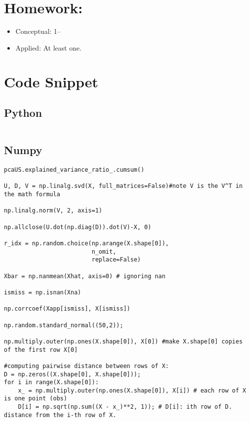 \documentclass[
  letterpaper,
  DIV=11,
  numbers=noendperiod]{scrreprt}
\providecommand{\tightlist}{%
  \setlength{\itemsep}{0pt}\setlength{\parskip}{0pt}}\usepackage{longtable,booktabs,array}
\begin{document}
\section{Homework:}\label{homework-8}

\begin{itemize}
\tightlist
\item
  Conceptual: 1--
\item
  Applied: At least one.
\end{itemize}

\section{Code Snippet}\label{code-snippet-6}

\subsection{Python}\label{python-10}

\begin{verbatim}

\end{verbatim}

\subsection{Numpy}\label{numpy-10}

\begin{verbatim}
pcaUS.explained_variance_ratio_.cumsum()

U, D, V = np.linalg.svd(X, full_matrices=False)#note V is the V^T in the math formula

np.linalg.norm(V, 2, axis=1)

np.allclose(U.dot(np.diag(D)).dot(V)-X, 0)

r_idx = np.random.choice(np.arange(X.shape[0]),
                         n_omit,
                         replace=False)

Xbar = np.nanmean(Xhat, axis=0) # ignoring nan

ismiss = np.isnan(Xna)

np.corrcoef(Xapp[ismiss], X[ismiss])

np.random.standard_normal((50,2));

np.multiply.outer(np.ones(X.shape[0]), X[0]) #make X.shape[0] copies of the first row X[0]

#computing pairwise distance between rows of X:
D = np.zeros((X.shape[0], X.shape[0]));
for i in range(X.shape[0]):
    x_ = np.multiply.outer(np.ones(X.shape[0]), X[i]) # each row of X is one point (obs)
    D[i] = np.sqrt(np.sum((X - x_)**2, 1)); # D[i]: ith row of D. distance from the i-th row of X.
\end{verbatim}
\end{document}
